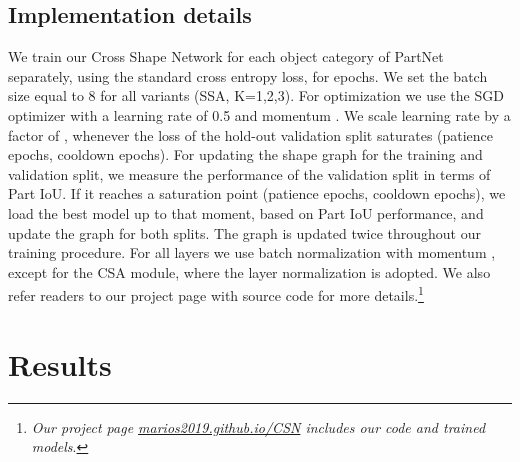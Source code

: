 \documentclass{egpubl}
\begin{document}
\subsection{Implementation details}
\label{subsec:implementation_details}
We train our Cross Shape Network  for each object category of 
PartNet \cite{Mo:2019} separately, using the standard cross entropy loss, for  epochs. We set 
the batch size equal to 8 for all variants (SSA, K=1,2,3). For optimization we use the SGD optimizer
\cite{SGD:2016} with a learning rate of 0.5 and momentum . We scale learning rate by a factor 
of , whenever the loss of the hold-out validation split saturates (patience  epochs, 
cooldown  epochs). For updating the shape graph for the training and validation split, we measure the performance of the validation split in terms of Part IoU. If it reaches a saturation point (patience  epochs, cooldown  epochs), we load the best model up to that moment, based on Part IoU performance, and update the graph for both splits. The graph is updated twice throughout our training procedure. For all layers we use batch normalization \cite{BN:2015} with momentum , except for the CSA module, where the layer normalization \cite{Ba:2016LayerN} is adopted. We also refer readers to our project page with source code for more details.\footnote{\emph{Our project page \href{https://marios2019.github.io/CSN/}{marios2019.github.io/CSN} includes our code and trained models}.} 
 
\section{Results}
\label{sec:results}
\end{document}
